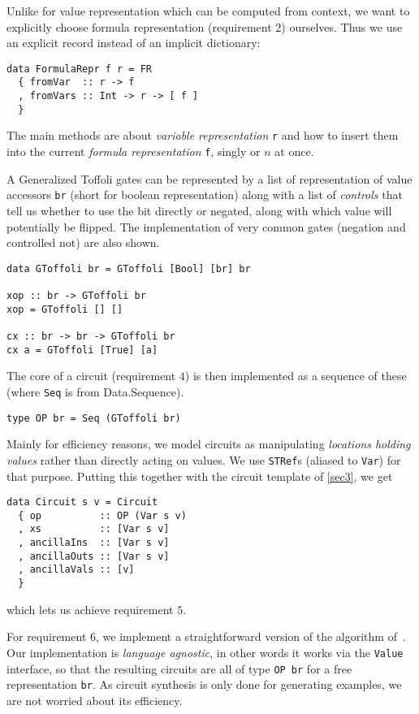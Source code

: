 \documentclass[sigplan,review]{acmart}
\theoremstyle{definition}
\begin{document}
Unlike for value representation which can be computed from context, we want
to explicitly choose formula representation (requirement 2) ourselves. Thus we
use an explicit record instead of an implicit dictionary:
\begin{verbatim}
data FormulaRepr f r = FR 
  { fromVar  :: r -> f
  , fromVars :: Int -> r -> [ f ]
  }
\end{verbatim}
\noindent The main methods are about \emph{variable representation} \texttt{r}
and how to insert them into the current \emph{formula representation} \texttt{f},
singly or $n$ at once.

A Generalized Toffoli gates can be represented by a list of representation of
value accessors \texttt{br} (short for boolean representation) along with a list
of \emph{controls} that tell us whether to use the bit directly or negated,
along with which value will potentially be flipped. The implementation of very 
common gates (negation and controlled not) are also shown.
\begin{verbatim}
data GToffoli br = GToffoli [Bool] [br] br

xop :: br -> GToffoli br
xop = GToffoli [] []

cx :: br -> br -> GToffoli br
cx a = GToffoli [True] [a]
\end{verbatim}
\noindent The core of a circuit (requirement $4$) is then implemented as a 
sequence of these (where \texttt{Seq} is from {Data.Sequence}).
\begin{verbatim}
type OP br = Seq (GToffoli br)
\end{verbatim}

\noindent Mainly for efficiency reasons, we model circuits as manipulating
\emph{locations holding values} rather than directly acting on values. We
use \texttt{STRef}s (aliased to \texttt{Var}) for that purpose. Putting this
together with the circuit template of \ref{sec3}, we get
\begin{verbatim}
data Circuit s v = Circuit
  { op          :: OP (Var s v)
  , xs          :: [Var s v]
  , ancillaIns  :: [Var s v]
  , ancillaOuts :: [Var s v]  
  , ancillaVals :: [v]
  }
\end{verbatim}
\noindent which lets us achieve requirement $5$.

For requirement $6$, we implement a straightforward version of 
the algorithm of~\cite{soeken2016fast}. Our implementation is
\emph{language agnostic}, in other words it works via the \texttt{Value}
interface, so that the resulting circuits are all of type \texttt{OP br}
for a free representation \texttt{br}. As circuit synthesis is only
done for generating examples, we are not worried about its efficiency.
\end{document}
